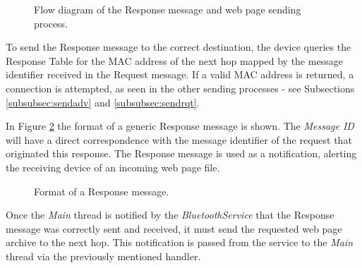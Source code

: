\begin{figure}[ht]
	\noindent{}
	\caption{\label{fig:rspsendflux} Flow diagram of the Response message and web page sending process.}
\end{figure}

To send the Response message to the correct destination, the device queries the Response Table for the \gls{MAC} address of the next hop mapped by the message identifier received in the Request message. If a valid \gls{MAC} address is returned, a connection is attempted, as seen in the other sending processes - see Subsections \ref{subsubsec:sendadv} and \ref{subsubsec:sendrqt}.

In Figure \ref{fig:rspmsg} the format of a generic Response message is shown. The \textit{Message ID} will have a direct correspondence with the message identifier of the request that originated this response. The Response message is used as a notification, alerting the receiving device of an incoming web page file.

\begin{figure}[ht]
   \noindent{}
	\caption{\label{fig:rspmsg} Format of a Response message.}
\end{figure}

Once the \textit{Main} thread is notified by the \textit{BluetoothService} that the Response message was correctly sent and received, it must send the requested web page archive to the next hop. This notification is passed from the service to the \textit{Main} thread via the previously mentioned handler.

